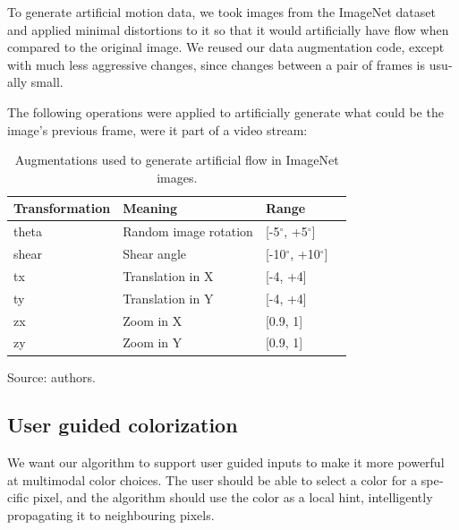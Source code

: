 \documentclass[12pt,openright,oneside,a4paper,english, brazilian]{abntex2}
\begin{document}
\begin{otherlanguage}{english}
\label{artificial_flow}

To generate artificial motion data, we took images from the ImageNet dataset and applied minimal distortions to it so that it would artificially have flow when compared to the original image. We reused our data augmentation code, except with much less aggressive changes, since changes between a pair of frames is usually small.

The following operations were applied to artificially generate what could be the image's previous frame, were it part of a video stream:

\begin{table}[H]
    \centering
    \caption{Augmentations used to generate artificial flow in ImageNet images.}
    \begin{tabular}{llll}
    Transformation & Meaning               & Range          &  \\ \hline
    theta          & Random image rotation & [-5$^{\circ}$, +5$^{\circ}$]   &  \\
    shear          & Shear angle           & [-10$^{\circ}$, +10$^{\circ}$] &  \\ \hline
    tx             & Translation in X      & [-4, +4]       &  \\
    ty             & Translation in Y      & [-4, +4]       &  \\ \hline
    zx             & Zoom in X             & [0.9, 1]       &  \\
    zy             & Zoom in Y             & [0.9, 1]       &  \\ \hline
    \end{tabular}
    \label{table:augmentations_imagenet}
    Source: authors.
\end{table}


\subsection{User guided colorization}
We want our algorithm to support user guided inputs to make it more powerful at multimodal color choices. The user should be able to select a color for a specific pixel, and the algorithm should use the color as a local hint, intelligently propagating it to neighbouring pixels.


\end{otherlanguage}
\end{document}
